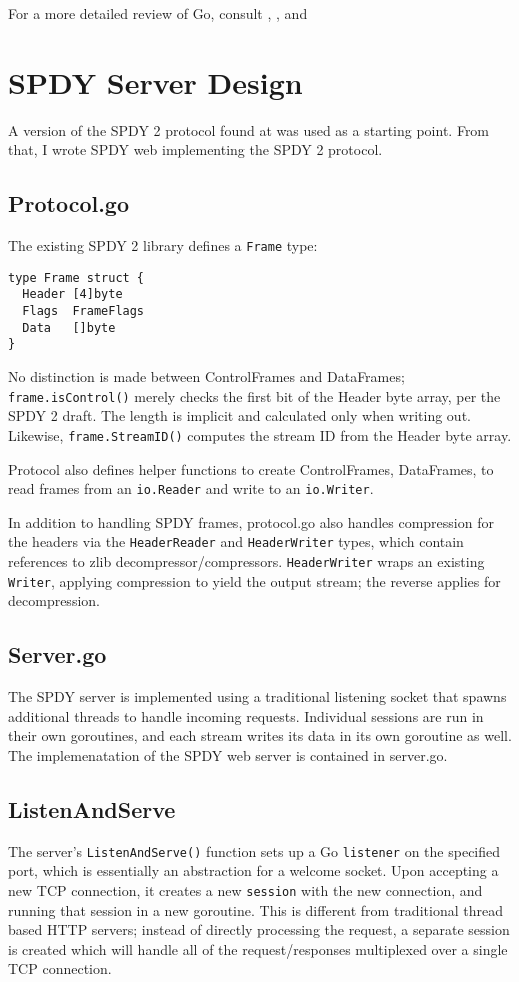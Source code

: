 \documentclass{article}
\begin{document}
For a more detailed review of Go, consult \cite{goabout}, \cite{gospec}, and \cite{goeff}

\section{SPDY Server Design}
A version of the SPDY 2 protocol found at \cite{light} was used as a starting point. From that, I wrote SPDY web implementing the SPDY 2 protocol.
\subsection{Protocol.go}
The existing SPDY 2 library defines a \verb|Frame| type:
\begin{verbatim}
type Frame struct {
  Header [4]byte
  Flags  FrameFlags
  Data   []byte
}
\end{verbatim}
No distinction is made between ControlFrames and DataFrames; \verb|frame.isControl()| merely checks the first bit of the Header byte array, per the SPDY 2 draft. The length is implicit and calculated only when writing out. Likewise, \verb|frame.StreamID()| computes the stream ID from the Header byte array.

Protocol also defines helper functions to create ControlFrames, DataFrames, to read frames from an \verb|io.Reader| and write to an \verb|io.Writer|. 

In addition to handling SPDY frames, protocol.go also handles compression for the headers via the \verb|HeaderReader| and \verb|HeaderWriter| types, which contain references to zlib decompressor/compressors. \verb|HeaderWriter| wraps an existing \verb|Writer|, applying compression to yield the output stream; the reverse applies for decompression.

\subsection{Server.go}
The SPDY server is implemented using a traditional listening socket that spawns additional threads to handle incoming requests. Individual sessions are run in their own goroutines, and each stream writes its data in its own goroutine as well. The implemenatation of the SPDY web server is contained in server.go.
\subsection{ListenAndServe}
The server's \verb|ListenAndServe()| function sets up a Go \verb|listener| on the specified port, which is essentially an abstraction for a welcome socket. Upon accepting a new TCP connection, it creates a new \verb|session| with the new connection, and running that session in a new goroutine. This is different from traditional thread based HTTP servers; instead of directly processing the request, a separate session is created which will handle all of the request/responses multiplexed over a single TCP connection. 
\end{document}
